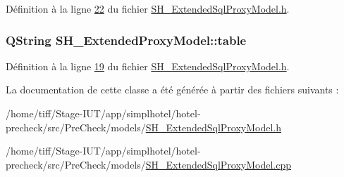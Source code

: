Définition à la ligne \hyperlink{SH__ExtendedSqlProxyModel_8h_source_l00022}{22} du fichier \hyperlink{SH__ExtendedSqlProxyModel_8h_source}{S\-H\-\_\-\-Extended\-Sql\-Proxy\-Model.\-h}.

\hypertarget{classSH__ExtendedProxyModel_a7eef4557a77444e9ce5c24c180392bfa}{
\subsubsection[{table}]{\setlength{\rightskip}{0pt plus 5cm}Q\-String S\-H\-\_\-\-Extended\-Proxy\-Model\-::table\hspace{0.3cm}{\ttfamily [read]}}}\label{classSH__ExtendedProxyModel_a7eef4557a77444e9ce5c24c180392bfa}


Définition à la ligne \hyperlink{SH__ExtendedSqlProxyModel_8h_source_l00019}{19} du fichier \hyperlink{SH__ExtendedSqlProxyModel_8h_source}{S\-H\-\_\-\-Extended\-Sql\-Proxy\-Model.\-h}.



La documentation de cette classe a été générée à partir des fichiers suivants \-:\begin{DoxyCompactItemize}
\item 
/home/tiff/\-Stage-\/\-I\-U\-T/app/simplhotel/hotel-\/precheck/src/\-Pre\-Check/models/\hyperlink{SH__ExtendedSqlProxyModel_8h}{S\-H\-\_\-\-Extended\-Sql\-Proxy\-Model.\-h}\item 
/home/tiff/\-Stage-\/\-I\-U\-T/app/simplhotel/hotel-\/precheck/src/\-Pre\-Check/models/\hyperlink{SH__ExtendedSqlProxyModel_8cpp}{S\-H\-\_\-\-Extended\-Sql\-Proxy\-Model.\-cpp}\end{DoxyCompactItemize}
